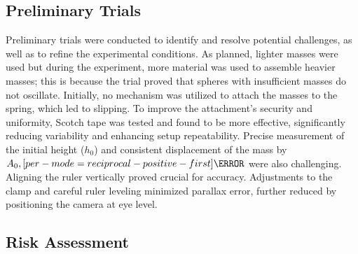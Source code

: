 \documentclass[a4paper,12pt]{article}
\let\oldsi\si
\renewcommand{\si}[1]{\oldsi[per-mode=reciprocal-positive-first]{#1}}
\begin{document}
\subsection{Preliminary Trials}

Preliminary trials were conducted to identify and resolve potential challenges, as well as to refine the experimental conditions. As planned, lighter masses were used but during the experiment, more material was used to assemble heavier masses; this is because the trial proved that spheres with insufficient masses do not oscillate. Initially, no mechanism was utilized to attach the masses to the spring, which led to slipping. To improve the attachment's security and uniformity, Scotch tape was tested and found to be more effective, significantly reducing variability and enhancing setup repeatability. Precise measurement of the initial height ($h_0$) and consistent displacement of the mass by $A_0,\si{\cm}$ were also challenging. Aligning the ruler vertically proved crucial for accuracy. Adjustments to the clamp and careful ruler leveling minimized parallax error, further reduced by positioning the camera at eye level.

\subsection{Risk Assessment}
\end{document}
